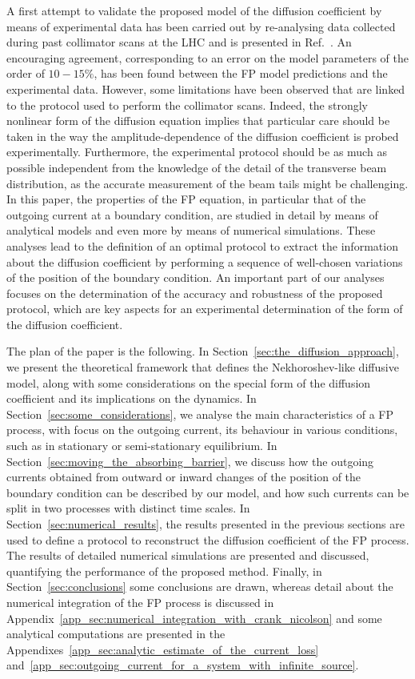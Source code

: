 {A first attempt to validate the proposed model of the diffusion coefficient by means of experimental data has been carried out by re-analysing data collected during past collimator scans at the LHC and is presented in Ref.~\cite{montanari:ipac22-mopost043}. An encouraging agreement, corresponding to an error on the model parameters of the order of $10-15\%$, has been found between the FP model predictions and the experimental data. However, some limitations have been observed that are linked to the protocol used to perform the collimator scans. Indeed, the strongly nonlinear form of the diffusion equation implies that particular care should be taken in the way the amplitude-dependence of the diffusion coefficient is probed experimentally. Furthermore, the experimental protocol should be as much as possible independent from the knowledge of the detail of the transverse beam distribution, as the accurate measurement of the beam tails might be challenging.} In this paper, the properties of the FP equation, in particular that of the outgoing current at a boundary condition, are studied in detail by means of analytical models and even more by means of numerical simulations. These analyses lead to the definition of an optimal protocol to extract the information about the diffusion coefficient by performing a sequence of well-chosen variations of the position of the boundary condition. An important part of our {analyses focuses} on the determination of the accuracy and robustness of the proposed protocol, {which are key aspects for an experimental determination of the form of the diffusion coefficient}.

The plan of the paper is the following. In Section~\ref{sec:the_diffusion_approach}, we present the theoretical framework that defines the Nekhoroshev-like diffusive model, along with some considerations on the special form of the diffusion coefficient and its implications on the dynamics. In Section~\ref{sec:some_considerations}, we analyse the main characteristics of a FP process, with focus on the outgoing current, its behaviour in various conditions, such as in stationary or semi-stationary equilibrium. In Section~\ref{sec:moving_the_absorbing_barrier}, we discuss how the outgoing currents obtained from outward or inward changes of the position of the boundary condition can be described by our model, and how such currents can be split in two processes with distinct time scales. In Section~\ref{sec:numerical_results}, the results presented in the previous sections are used to define a protocol to reconstruct the diffusion coefficient of the FP process. The results of detailed numerical simulations are presented and discussed, quantifying the performance of the proposed method. Finally, in Section~\ref{sec:conclusions} some conclusions are drawn, whereas detail about the numerical integration of the FP process is discussed in Appendix~\ref{app_sec:numerical_integration_with_crank_nicolson} and some analytical computations are presented in the Appendixes~\ref{app_sec:analytic_estimate_of_the_current_loss} and~\ref{app_sec:outgoing_current_for_a_system_with_infinite_source}.

